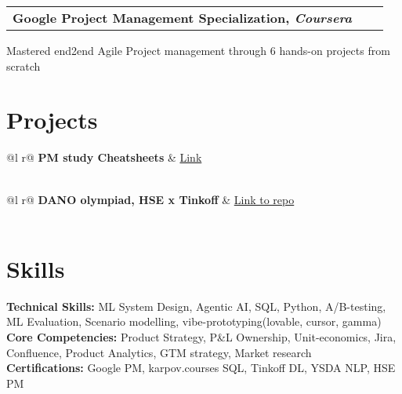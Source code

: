\documentclass[a4paper,12pt]{article}
\makeatletter
\newenvironment{jobshort}[2]
    {
    \begin{tabularx}{\linewidth}{@{}l X r@{}}
    \textbf{#1} & \hfill &  #2 \\[0.25pt]
    \end{tabularx}
    }
    {
    }
\makeatother
\begin{document}
\begin{jobshort}{Google Project Management Specialization, \textit{Coursera}}{}
\end{jobshort}
\noindent Mastered end2end Agile Project management through 6 hands-on projects from scratch

\section{Projects}

\begin{tabularx}{\linewidth}{ @{}l r@{} }
\textbf{PM study Cheatsheets} & \hfill \href{https://slavikss.github.io/blog}{Link} \\[3.75pt]
  \\
\end{tabularx}

\begin{tabularx}{\linewidth}{ @{}l r@{} }
\textbf{DANO olympiad, HSE x Tinkoff} & \hfill \href{https://github.com/Slavikss/tinkoff-cinema-tickets}{Link to repo} \\[3.75pt]
  \\
\end{tabularx}


\section{Skills}
\textbf{Technical Skills:} ML System Design, Agentic AI, SQL, Python, A/B-testing, ML Evaluation, Scenario modelling, vibe-prototyping(lovable, cursor, gamma) \\
\textbf{Core Competencies:} Product Strategy, P\&L Ownership, Unit-economics, Jira, Confluence, Product Analytics, GTM strategy, Market research \\
\textbf{Certifications:} Google PM, karpov.courses SQL, Tinkoff DL, YSDA NLP, HSE PM \\

\enlargethispage{-\baselineskip}
\end{document}
